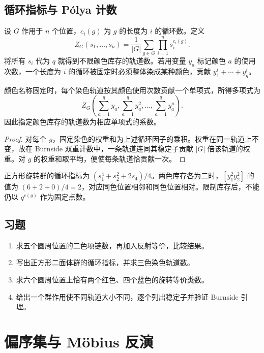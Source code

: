 \documentclass[UTF8,12pt,a4paper,fontset=fandol]{ctexbook}
\begin{document}
\section{循环指标与 P\'olya 计数}

设 $G$ 作用于 $n$ 个位置，$c_i(g)$ 为 $g$ 的长度为 $i$ 的循环数。定义
\begin{equation}
 Z_G(s_1,\ldots,s_n)=\frac1{|G|}\sum_{g\in G}\prod_{i=1}^n s_i^{c_i(g)}.
 \label{eq:cycle-index}
\end{equation}
将所有 $s_i$ 代为 $q$ 就得到不限颜色库存的轨道数。若用变量 $y_a$ 标记颜色 $a$ 的使用次数，一个长度为 $i$ 的循环被固定时必须整体染成某种颜色，贡献 $y_1^i+\cdots+y_q^i$。

\begin{theorem}
颜色名称固定时，每个染色轨道按其颜色使用次数贡献一个单项式，所得多项式为
\[
 Z_G\left(\sum_{a=1}^q y_a,\sum_{a=1}^q y_a^2,\ldots,
                 \sum_{a=1}^q y_a^n\right).
\]
因此指定颜色库存的轨道数为相应单项式的系数。
\end{theorem}
\begin{proof}
对每个 $g$，固定染色的权重和为上述循环因子的乘积。权重在同一轨道上不变，故在 Burnside 双重计数中，一条轨道连同其稳定子贡献 $|G|$ 倍该轨道的权重。对 $g$ 的权重和取平均，便使每条轨道恰贡献一次。
\end{proof}

正方形旋转群的循环指标为 $(s_1^4+s_2^2+2s_4)/4$。两色库存各为二时，$[y_1^2y_2^2]$ 的值为 $(6+2+0)/4=2$，对应同色位置相邻和同色位置相对。限制库存后，不能仍以 $q^{c(g)}$ 作为固定点数。

\section{习题}
\begin{enumerate}
  \item\label{ex:symmetry-1} 求五个圆周位置的二色项链数，再加入反射等价，比较结果。
  \item\label{ex:symmetry-2} 写出正方形二面体群的循环指标，并求三色染色轨道数。
  \item\label{ex:symmetry-3} 求六个圆周位置上恰有两个红色、四个蓝色的旋转等价类数。
  \item\label{ex:symmetry-4} 给出一个群作用使不同轨道大小不同，逐个列出稳定子并验证 Burnside 引理。
\end{enumerate}

\chapter{偏序集与 M\"obius 反演}
\label{ch:posets}
\end{document}
